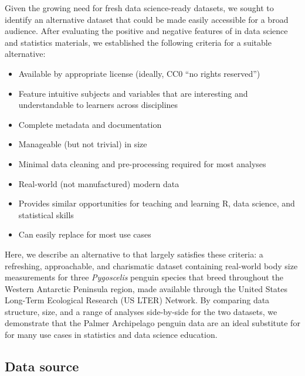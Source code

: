 Given the growing need for fresh data science-ready datasets, we sought
to identify an alternative dataset that could be made easily accessible
for a broad audience. After evaluating the positive and negative
features of  in data science and statistics materials, we
established the following criteria for a suitable alternative:

\begin{itemize}
\tightlist
\item
  Available by appropriate license (ideally, CC0 ``no rights reserved'')
\item
  Feature intuitive subjects and variables that are interesting and
  understandable to learners across disciplines
\item
  Complete metadata and documentation
\item
  Manageable (but not trivial) in size
\item
  Minimal data cleaning and pre-processing required for most analyses
\item
  Real-world (not manufactured) modern data
\item
  Provides similar opportunities for teaching and learning R, data
  science, and statistical skills
\item
  Can easily replace  for most use cases
\end{itemize}

Here, we describe an alternative to  that largely satisfies
these criteria: a refreshing, approachable, and charismatic dataset
containing real-world body size measurements for three \emph{Pygoscelis}
penguin species that breed throughout the Western Antarctic Peninsula
region, made available through the United States Long-Term Ecological
Research (US LTER) Network. By comparing data structure, size, and a
range of analyses side-by-side for the two datasets, we demonstrate that
the Palmer Archipelago penguin data are an ideal substitute for
 for many use cases in statistics and data science education.

\hypertarget{data-source}{%
\subsection{Data source}\label{data-source}}

